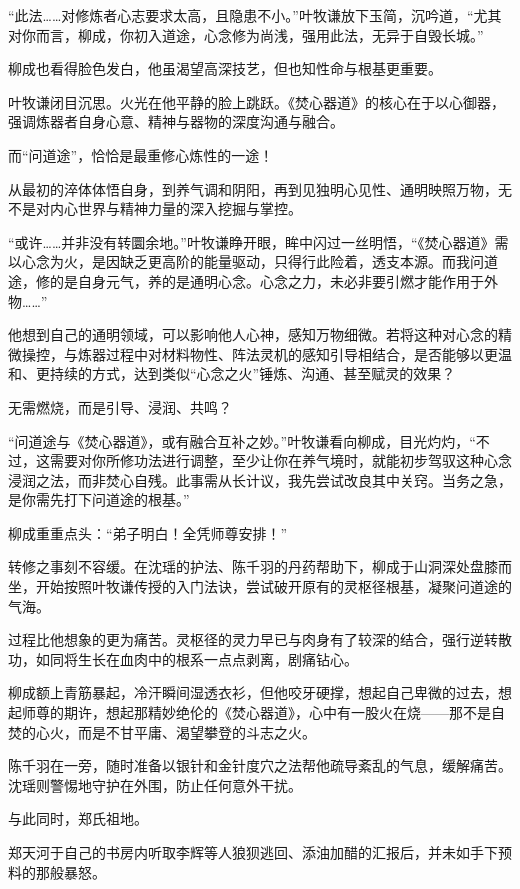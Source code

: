 “此法……对修炼者心志要求太高，且隐患不小。”叶牧谦放下玉简，沉吟道，“尤其对你而言，柳成，你初入道途，心念修为尚浅，强用此法，无异于自毁长城。”

柳成也看得脸色发白，他虽渴望高深技艺，但也知性命与根基更重要。

叶牧谦闭目沉思。火光在他平静的脸上跳跃。《焚心器道》的核心在于以心御器，强调炼器者自身心意、精神与器物的深度沟通与融合。

而“问道途”，恰恰是最重修心炼性的一途！

从最初的淬体体悟自身，到养气调和阴阳，再到见独明心见性、通明映照万物，无不是对内心世界与精神力量的深入挖掘与掌控。

“或许……并非没有转圜余地。”叶牧谦睁开眼，眸中闪过一丝明悟，“《焚心器道》需以心念为火，是因缺乏更高阶的能量驱动，只得行此险着，透支本源。而我问道途，修的是自身元气，养的是通明心念。心念之力，未必非要引燃才能作用于外物……”

他想到自己的通明领域，可以影响他人心神，感知万物细微。若将这种对心念的精微操控，与炼器过程中对材料物性、阵法灵机的感知引导相结合，是否能够以更温和、更持续的方式，达到类似“心念之火”锤炼、沟通、甚至赋灵的效果？

无需燃烧，而是引导、浸润、共鸣？

“问道途与《焚心器道》，或有融合互补之妙。”叶牧谦看向柳成，目光灼灼，“不过，这需要对你所修功法进行调整，至少让你在养气境时，就能初步驾驭这种心念浸润之法，而非焚心自残。此事需从长计议，我先尝试改良其中关窍。当务之急，是你需先打下问道途的根基。”

柳成重重点头：“弟子明白！全凭师尊安排！”

转修之事刻不容缓。在沈瑶的护法、陈千羽的丹药帮助下，柳成于山洞深处盘膝而坐，开始按照叶牧谦传授的入门法诀，尝试破开原有的灵枢径根基，凝聚问道途的气海。

过程比他想象的更为痛苦。灵枢径的灵力早已与肉身有了较深的结合，强行逆转散功，如同将生长在血肉中的根系一点点剥离，剧痛钻心。

柳成额上青筋暴起，冷汗瞬间湿透衣衫，但他咬牙硬撑，想起自己卑微的过去，想起师尊的期许，想起那精妙绝伦的《焚心器道》，心中有一股火在烧——那不是自焚的心火，而是不甘平庸、渴望攀登的斗志之火。

陈千羽在一旁，随时准备以银针和金针度穴之法帮他疏导紊乱的气息，缓解痛苦。沈瑶则警惕地守护在外围，防止任何意外干扰。

\vspace{2em}

与此同时，郑氏祖地。

郑天河于自己的书房内听取李辉等人狼狈逃回、添油加醋的汇报后，并未如手下预料的那般暴怒。

